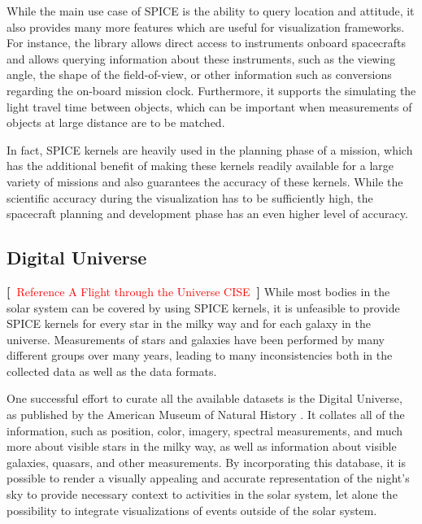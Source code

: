 \documentclass{vgtc}                %
\newcommand{\todo}[1]{\textbf{[~}\textcolor {red}{#1}\marginpar{\textcolor {red}{\centerline{{\Huge \textbf{!}}}}}\textbf{~]}}
\begin{document}
While the main use case of SPICE is the ability to query location and attitude, it also provides many more features which are useful for visualization frameworks. For instance, the library allows direct access to instruments onboard spacecrafts and allows querying information about these instruments, such as the viewing angle, the shape of the field-of-view, or other information such as conversions regarding the on-board mission clock. Furthermore, it supports the simulating the light travel time between objects, which can be important when measurements of objects at large distance are to be matched.

In fact, SPICE kernels are heavily used in the planning phase of a mission, which has the additional benefit of making these kernels readily available for a large variety of missions and also guarantees the accuracy of these kernels. While the scientific accuracy during the visualization has to be sufficiently high, the spacecraft planning and development phase has an even higher level of accuracy.

\subsection*{Digital Universe}
\todo{Reference A Flight through the Universe CISE}
While most bodies in the solar system can be covered by using SPICE kernels, it is unfeasible to provide SPICE kernels for every star in the milky way and for each galaxy in the universe. Measurements of stars and galaxies have been performed by many different groups over many years, leading to many inconsistencies both in the collected data as well as the data formats.

One successful effort to curate all the available datasets is the Digital Universe, as published by the American Museum of Natural History \cite{DigitalUniverse}. It collates all of the information, such as position, color, imagery, spectral measurements, and much more about visible stars in the milky way, as well as information about visible galaxies, quasars, and other measurements. By incorporating this database, it is possible to render a visually appealing and accurate representation of the night's sky to provide necessary context to activities in the solar system, let alone the possibility to integrate visualizations of events outside of the solar system.
\end{document}
